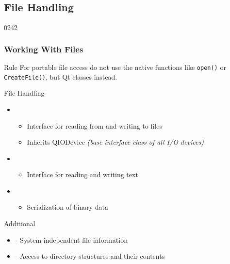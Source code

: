 %
%
%
%

\subsection{File Handling}

\begin{slide}[fragile]{0242}\frametitle{Working With Files} \label{working_with_files}
\begin{block}{Rule}
For portable file access do not use the native
functions like \texttt{open()} or \texttt{CreateFile()}, but Qt classes
instead.  
\end{block}
File Handling 
\begin{itemize}
\item {}
  \begin{itemize}    
  \item Interface for reading from and writing to files
  \item Inherits QIODevice \emph{(base interface class of all I/O devices)}
  \end{itemize}    
\item {} 
  \begin{itemize}    
  \item Interface for reading and writing text
  \end{itemize}
\item {} 
  \begin{itemize}    
  \item Serialization of binary data 
  \end{itemize}
\end{itemize}
Additional
\begin{itemize}
\item {} - System-independent file information
\item {} - Access to directory structures and their contents
\end{itemize}
\end{slide}

